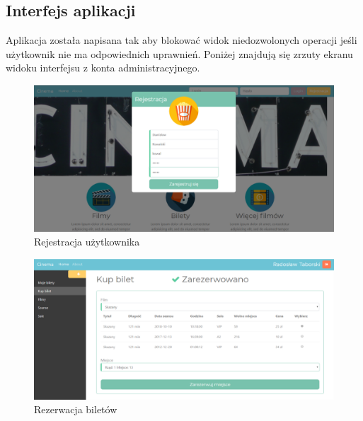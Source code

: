 \lssetdef




\subsection{Interfejs aplikacji}

Aplikacja została napisana tak aby blokować widok niedozwolonych operacji jeśli użytkownik nie ma odpowiednich uprawnień. Poniżej znajdują się zrzuty ekranu widoku interfejsu z konta administracyjnego. 

\begin{figure} [H]
	\centering
	\includegraphics[width=1\linewidth]{rozdzial05/interfejs/rejestracja.png}
	\caption{Rejestracja użytkownika}
	\label{fig:screen1}
\end{figure}


\begin{figure} [H]
	\centering
	\includegraphics[width=1\linewidth]{rozdzial05/interfejs/kupBilet.png}
	\caption{Rezerwacja biletów}
	\label{fig:screen2}
\end{figure}

